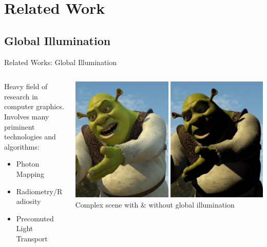 \documentclass[10pt,compress,professionalfont]{beamer}
\begin{document}
\section{Related Work}
\subsection{Global Illumination}
\begin{frame}{Related Works: Global Illumination}


    \begin{columns}
        \begin{column}{0.4\textwidth}

            Heavy field of research in computer graphics.\\
            \vspace{8mm}
            Involves many priminent technologies and algorithms:\\
            \vspace{2mm}
            \begin{itemize}
                \item Photon Mapping\\
                \vspace{2mm}

                \item Radiometry/Radiosity\\
                \vspace{2mm}

                \item Precomuted Light Transport\\
            \end{itemize}

        \end{column}
        \begin{column}{0.6\textwidth}
            \includegraphics[width=\textwidth]{../img/external/shrek}\\
            {\centering\scriptsize Complex scene with \& without global illumination\\}
        \end{column}
    \end{columns}

\end{frame}
\end{document}
